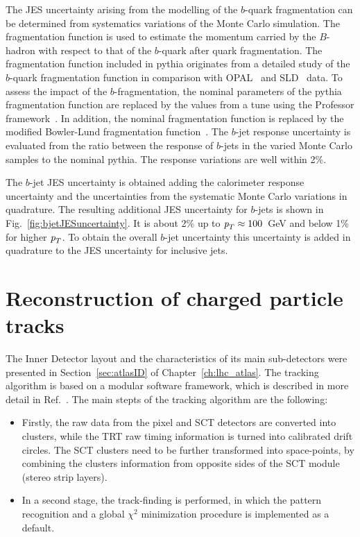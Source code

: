 \begin{itemize}
The JES uncertainty arising from the modelling of the $b$-quark fragmentation can be determined from systematics variations of the Monte Carlo simulation. The fragmentation function is used to estimate the momentum carried by the $B$-hadron with respect to that of the $b$-quark after quark fragmentation.   The fragmentation function included in {\sc pythia} originates from a detailed study of the $b$-quark fragmentation function in comparison with OPAL~\cite{Abbiendi:2002vt} and SLD~\cite{Abe:2002iq} data. To assess the impact of the $b$-fragmentation, the nominal parameters of the {\sc pythia} fragmentation function are replaced by the values from a tune using the Professor framework~\cite{Professor}. In addition, the nominal fragmentation function is replaced by the modified Bowler-Lund fragmentation function~\cite{BowlerLund}. The $b$-jet response uncertainty is evaluated from the ratio between the response of $b$-jets in the varied Monte Carlo samples to the nominal {\sc pythia}. The response variations are well within 2\%.

The $b$-jet JES uncertainty is obtained adding the calorimeter response uncertainty and the uncertainties from the systematic Monte Carlo variations in quadrature. The resulting additional JES uncertainty for $b$-jets is shown in Fig.~\ref{fig:bjetJESuncertainty}. It is about 2\% up to ${\emph{p}_{T}} \approx 100$~GeV and below 1\% for higher ${\emph{p}_{T}}$. To obtain the overall $b$-jet uncertainty this uncertainty is added in quadrature to the JES uncertainty for inclusive jets.


\section{Reconstruction of charged particle tracks}\label{sec:trackreco}

The Inner Detector layout and the characteristics of its main sub-detectors were presented in Section~\ref{sec:atlasID} of Chapter~\ref{ch:lhc_atlas}. The tracking algorithm is based on a modular software framework, which is described in more detail in Ref.~\cite{Cornelissen:1020106}. The main stepts of the tracking algorithm are the following:

\begin{itemize}
\item
Firstly, the raw data from the pixel and SCT detectors are converted into clusters, while the TRT raw timing information is turned into calibrated drift circles. The SCT clusters need to be further transformed into space-points, by combining the clusters information from opposite sides of the SCT module (stereo strip layers).
\item
In a second stage, the track-finding is performed, in which the pattern recognition and a global $\chi^2$ minimization procedure is implemented as a default.


\end{itemize}
\end{itemize}
